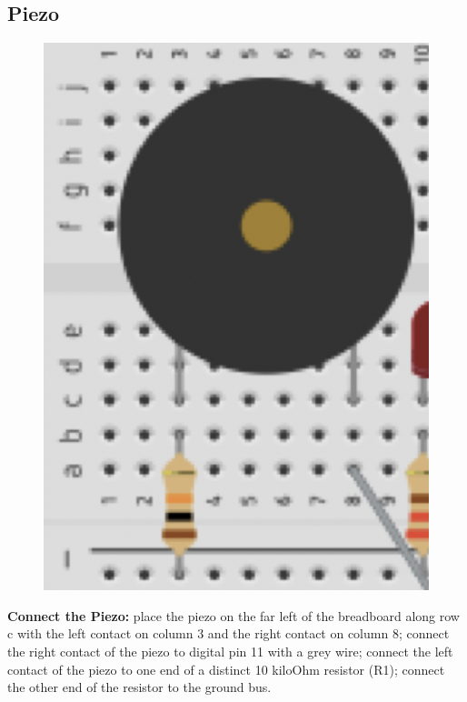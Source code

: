 \documentclass[a4paper]{article}
\begin{document}
\subsection{Piezo}

\begin{figure}
  \vspace{-50pt}
  \begin{center}
    \includegraphics[width=1.1\linewidth]{piezo.png}
  \end{center}
\vspace{-25pt}
\end{figure}

\noindent \textbf{Connect the Piezo:} place the piezo on the far left of the breadboard along row c with the left contact on column 3 and the right contact on column 8; connect the right contact of the piezo to digital pin 11 with a grey wire; connect the left contact of the piezo to one end of a distinct 10 kiloOhm resistor (R1); connect the other end of the resistor to the ground bus.
\end{document}
